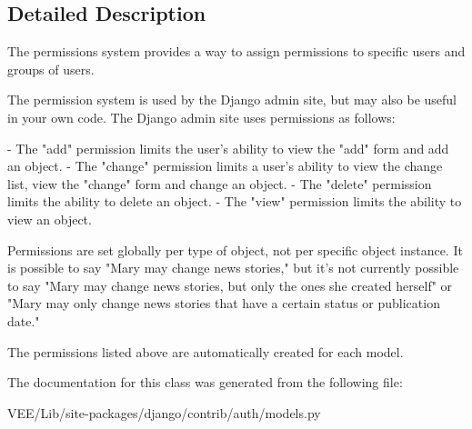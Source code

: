 \subsection{Detailed Description}
\begin{DoxyVerb}The permissions system provides a way to assign permissions to specific
users and groups of users.

The permission system is used by the Django admin site, but may also be
useful in your own code. The Django admin site uses permissions as follows:

    - The "add" permission limits the user's ability to view the "add" form
      and add an object.
    - The "change" permission limits a user's ability to view the change
      list, view the "change" form and change an object.
    - The "delete" permission limits the ability to delete an object.
    - The "view" permission limits the ability to view an object.

Permissions are set globally per type of object, not per specific object
instance. It is possible to say "Mary may change news stories," but it's
not currently possible to say "Mary may change news stories, but only the
ones she created herself" or "Mary may only change news stories that have a
certain status or publication date."

The permissions listed above are automatically created for each model.
\end{DoxyVerb}
 

The documentation for this class was generated from the following file\+:\begin{DoxyCompactItemize}
\item 
V\+E\+E/\+Lib/site-\/packages/django/contrib/auth/models.\+py\end{DoxyCompactItemize}
